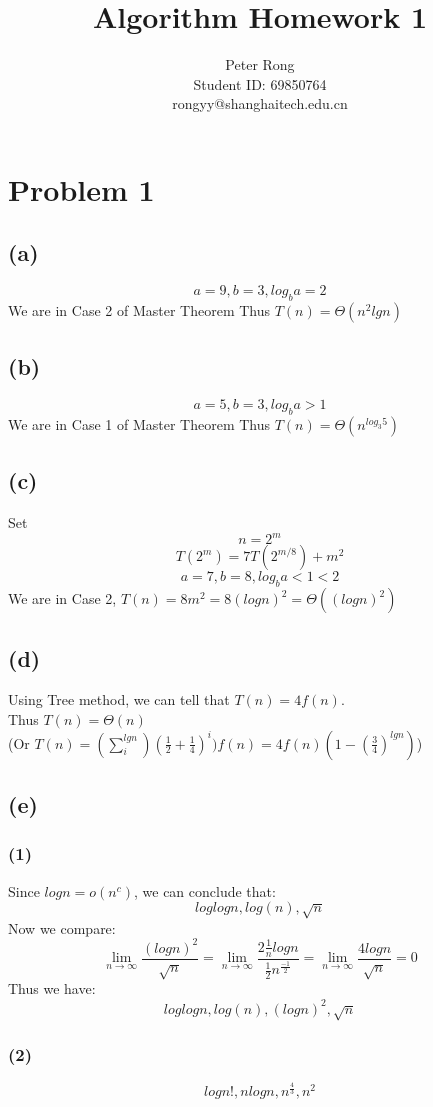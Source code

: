 \documentclass{article}
\title{Algorithm Homework 1}
\author{Peter Rong \\ Student ID: 69850764 \\ rongyy@shanghaitech.edu.cn}
\begin{document}
\maketitle

\section*{Problem 1}
	\subsection*{(a)}
		$$ a = 9, b = 3, log_b a = 2$$
		We are in Case 2 of Master Theorem
		Thus $T(n) = \Theta(n^2lgn)$
	\subsection*{(b)}
		$$ a = 5, b = 3, log_b a > 1$$
		We are in Case 1 of Master Theorem
		Thus $T(n) = \Theta(n^{log_3 5})$
	\subsection*{(c)}
		Set $$ n = 2^m $$
		$$ T(2^m) = 7T(2^{m/8}) + m^2 $$
		$$ a = 7, b = 8, log_b a < 1 < 2 $$
		We are in Case 2, $T(n) = 8m^2 = 8(log n)^2 = \Theta((log n)^2)$
	\subsection*{(d)}
		Using Tree method, we can tell that $T(n) = 4f(n)$.\\
		Thus $T(n) = \Theta(n)$\\
		(Or $T(n) = (\sum_i^{lgn})(\frac{1}{2}+\frac{1}{4})^i)f(n) = 4f(n)(1-(\frac{3}{4})^{lgn})$)
	\subsection*{(e)}
		\subsubsection*{(1)}
			Since $log n = o(n^c)$, we can conclude that:
			$$ log log n , log(n) , \sqrt{n}$$
			Now we compare:
			$$ \lim_{n \to \infty}\frac{(log n)^2}{\sqrt{n}}
				= \lim_{n \to \infty}\frac{2\frac{1}{n}log n}{\frac{1}{2}n^{\frac{-1}{2}}}
				= \lim_{n \to \infty}\frac{4logn}{\sqrt{n}} = 0
			$$
			Thus we have:
			$$ log log n , log(n), (log n)^2, \sqrt{n}$$
		\subsubsection*{(2)}
			$$ log n! , n logn , n^\frac{4}{3}, n^2 $$
\end{document}
